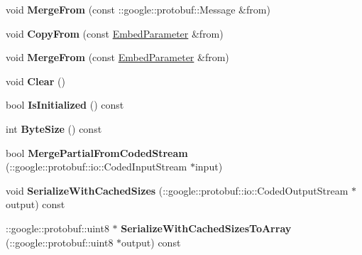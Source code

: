 \begin{DoxyCompactItemize}
void {\bfseries Merge\+From} (const \+::google\+::protobuf\+::\+Message \&from)
\item 
\mbox{\label{classcaffe_1_1_embed_parameter_ac69471660ebe6d9fc2eb2135a3142653}} 
void {\bfseries Copy\+From} (const \mbox{\hyperlink{classcaffe_1_1_embed_parameter}{Embed\+Parameter}} \&from)
\item 
\mbox{\label{classcaffe_1_1_embed_parameter_a8b53699ecc0e8165830d13e96fb0a4f7}} 
void {\bfseries Merge\+From} (const \mbox{\hyperlink{classcaffe_1_1_embed_parameter}{Embed\+Parameter}} \&from)
\item 
\mbox{\label{classcaffe_1_1_embed_parameter_aa00fc520d7c92a9fcb0c052a92cfb78b}} 
void {\bfseries Clear} ()
\item 
\mbox{\label{classcaffe_1_1_embed_parameter_af8c0e2e2d9426fc8016afdc451f46cd0}} 
bool {\bfseries Is\+Initialized} () const
\item 
\mbox{\label{classcaffe_1_1_embed_parameter_affc8c08f3bf7c222aa19ef32130bef44}} 
int {\bfseries Byte\+Size} () const
\item 
\mbox{\label{classcaffe_1_1_embed_parameter_aff3e171a5284b7438960652b31859ac7}} 
bool {\bfseries Merge\+Partial\+From\+Coded\+Stream} (\+::google\+::protobuf\+::io\+::\+Coded\+Input\+Stream $\ast$input)
\item 
\mbox{\label{classcaffe_1_1_embed_parameter_a7947b4f468e5e2f16c562da750810353}} 
void {\bfseries Serialize\+With\+Cached\+Sizes} (\+::google\+::protobuf\+::io\+::\+Coded\+Output\+Stream $\ast$output) const
\item 
\mbox{\label{classcaffe_1_1_embed_parameter_a6926c32778c730f9c2fab579c2a3e8c8}} 
\+::google\+::protobuf\+::uint8 $\ast$ {\bfseries Serialize\+With\+Cached\+Sizes\+To\+Array} (\+::google\+::protobuf\+::uint8 $\ast$output) const
\item 
\mbox{\label{classcaffe_1_1_embed_parameter_ab3edcf5db1f87b472bdef13079c92d4b}} 

\end{DoxyCompactItemize}
